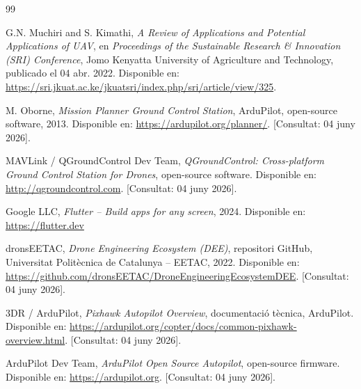 \documentclass[spanish,final]{setup/eetac_tfc_pfc}
\begin{document}














\begin{thebibliography}{99}

G.N. Muchiri and S. Kimathi,
\textit{A Review of Applications and Potential Applications of UAV},
en \textit{Proceedings of the Sustainable Research \& Innovation (SRI) Conference},
Jomo Kenyatta University of Agriculture and Technology,
publicado el 04 abr. 2022.
Disponible en: \url{https://sri.jkuat.ac.ke/jkuatsri/index.php/sri/article/view/325}.

M. Oborne,
\textit{Mission Planner Ground Control Station},
ArduPilot, open-source software, 2013.
Disponible en: \url{https://ardupilot.org/planner/}.
[Consultat: 04 juny 2026].

MAVLink / QGroundControl Dev Team,
\textit{QGroundControl: Cross-platform Ground Control Station for Drones},
open-source software.
Disponible en: \url{http://qgroundcontrol.com}.
[Consultat: 04 juny 2026].

Google LLC,
\textit{Flutter -- Build apps for any screen},
2024.
Disponible en: \url{https://flutter.dev}

dronsEETAC,
\textit{Drone Engineering Ecosystem (DEE)},
repositori GitHub, Universitat Politècnica de Catalunya -- EETAC, 2022.
Disponible en: \url{https://github.com/dronsEETAC/DroneEngineeringEcosystemDEE}.
[Consultat: 04 juny 2026].

3DR / ArduPilot,
\textit{Pixhawk Autopilot Overview},
documentació tècnica, ArduPilot.
Disponible en: \url{https://ardupilot.org/copter/docs/common-pixhawk-overview.html}.
[Consultat: 04 juny 2026].

ArduPilot Dev Team,
\textit{ArduPilot Open Source Autopilot},
open-source firmware.
Disponible en: \url{https://ardupilot.org}.
[Consultat: 04 juny 2026].



\end{thebibliography}
\end{document}
